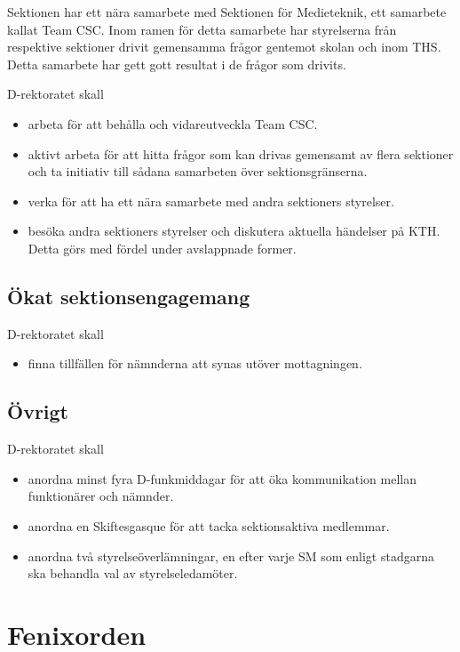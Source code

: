 \documentclass{dgovdoc}
\begin{document}
Sektionen har ett nära samarbete med Sektionen för Medieteknik, ett samarbete
kallat Team CSC. Inom ramen för detta samarbete har styrelserna från respektive
sektioner drivit gemensamma frågor gentemot skolan och inom THS. Detta
samarbete har gett gott resultat i de frågor som drivits.

D-rektoratet skall

\begin{itemize}
\item arbeta för att behålla och vidareutveckla Team CSC.
\item aktivt arbeta för att hitta frågor som kan drivas gemensamt av flera
  sektioner och ta initiativ till sådana samarbeten över sektionsgränserna.
\item verka för att ha ett nära samarbete med andra sektioners styrelser.
\item besöka andra sektioners styrelser och diskutera aktuella händelser på
  KTH. Detta görs med fördel under avslappnade former.
\end{itemize}

\subsection{Ökat sektionsengagemang}

D-rektoratet skall

\begin{itemize}
\item finna tillfällen för nämnderna att synas utöver mottagningen.
\end{itemize}

\subsection{Övrigt}

D-rektoratet skall

\begin{itemize}
\item anordna minst fyra D-funkmiddagar för att öka kommunikation mellan
  funktionärer och nämnder.
\item anordna en Skiftesgasque för att tacka sektionsaktiva medlemmar.
\item anordna två styrelseöverlämningar, en efter varje SM som enligt stadgarna
  ska behandla val av styrelseledamöter.
\end{itemize}

\section{Fenixorden}
\end{document}
